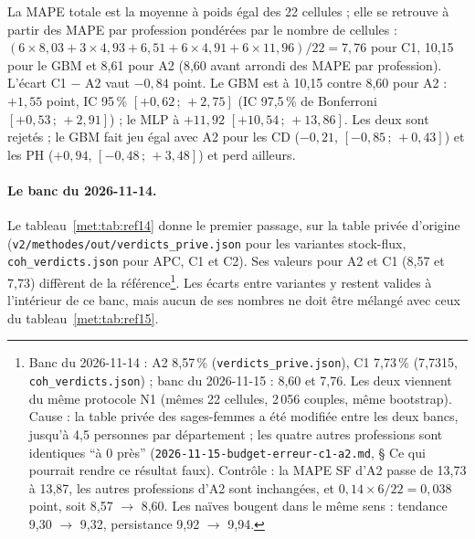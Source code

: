La MAPE totale est la moyenne à poids égal des 22 cellules ; elle se retrouve à partir des MAPE par
profession pondérées par le nombre de cellules :
$(6\times8{,}03 + 3\times4{,}93 + 6{,}51 + 6\times4{,}91 + 6\times11{,}96)/22 = 7{,}76$\derive{} pour C1,
10,15\derive{} pour le GBM et 8,61\derive{} pour A2 (8,60\mesure{} avant arrondi des MAPE par profession).
L'écart C1 $-$ A2 vaut $-0{,}84$\derive{} point. Le GBM est à 10,15 contre 8,60 pour A2 :
$+1{,}55$\mesure{} point, IC 95\,\% $[+0{,}62\,;\,+2{,}75]$\mesure{} (IC 97,5\,\% de Bonferroni
$[+0{,}53\,;\,+2{,}91]$\mesure) ; le MLP à $+11{,}92$\mesure{} $[+10{,}54\,;\,+13{,}86]$\mesure. Les deux sont
rejetés ; le GBM fait jeu égal avec A2 pour les CD ($-0{,}21$\mesure, $[-0{,}85\,;\,+0{,}43]$\mesure) et
les PH ($+0{,}94$\mesure, $[-0{,}48\,;\,+3{,}48]$\mesure) et perd ailleurs.

\paragraph{Le banc du 2026-11-14.} Le tableau~\ref{met:tab:ref14} donne le premier passage, sur la table
privée d'origine (\texttt{v2/methodes/out/verdicts\_prive.json} pour les variantes stock-flux,
\texttt{coh\_verdicts.json} pour APC, C1 et C2). Ses valeurs pour A2 et C1 (8,57 et 7,73) diffèrent de la
référence\footnote{Banc du 2026-11-14 : A2 8,57\,\%\mesure{} (\texttt{verdicts\_prive.json}), C1
7,73\,\%\mesure{} (7,7315, \texttt{coh\_verdicts.json}) ; banc du 2026-11-15 : 8,60\mesure{} et
7,76\mesure. Les deux viennent du même protocole N1 (mêmes 22 cellules, 2\,056 couples, même bootstrap).
Cause : la table privée des sages-femmes a été modifiée entre les deux bancs, jusqu'à 4,5\mesure{}
personnes par département ; les quatre autres professions sont identiques \enquote{à 0 près}
(\texttt{2026-11-15-budget-erreur-c1-a2.md}, § Ce qui pourrait rendre ce résultat faux). Contrôle : la
MAPE SF d'A2 passe de 13,73\mesure{} à 13,87\mesure, les autres professions d'A2 sont inchangées, et
$0{,}14 \times 6/22 = 0{,}038$\derive{} point, soit 8,57 $\to$ 8,60. Les naïves bougent dans le même
sens : tendance 9,30 $\to$ 9,32\mesure, persistance 9,92 $\to$ 9,94\mesure.}. Les écarts entre variantes y
restent valides à l'intérieur de ce banc, mais aucun de ses nombres ne doit être mélangé avec ceux du
tableau~\ref{met:tab:ref15}.

